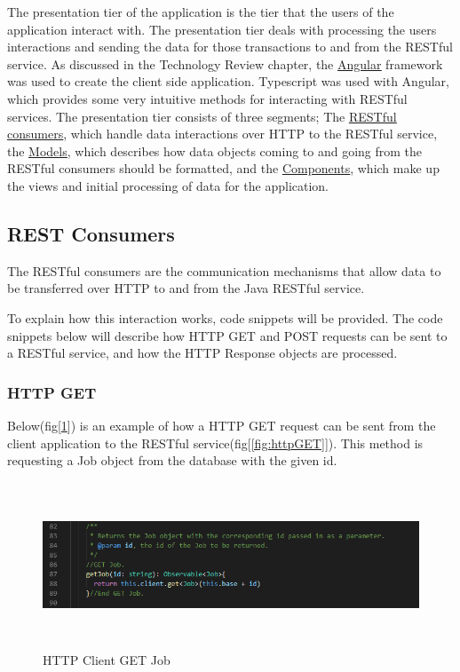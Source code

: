The presentation tier of the application is the tier that the users of the application interact with. The presentation tier deals with processing the users interactions and sending the data for those transactions to and from the RESTful service. As discussed in the Technology Review chapter, the  \hyperref[sec:TechnologyReviewPresentationTier]{\underline{Angular}} framework was used to create the client side application. Typescript was used with Angular, which provides some very intuitive methods for interacting with RESTful services. The presentation tier consists of three segments; The \hyperref[sec:SystemDesignRESTConsumers]{\underline{RESTful consumers}}, which handle data interactions over HTTP to the RESTful service, the \hyperref[sec:SystemDesignModels]{\underline{Models}}, which describes how data objects coming to and going from the RESTful consumers should be formatted, and the \hyperref[sec:SystemDesignComponents]{\underline{Components}}, which make up the views and initial processing of data for the application. 


\subsection{REST Consumers}
\label{sec:SystemDesignRESTConsumers}

The RESTful consumers are the communication mechanisms that allow data to be transferred over HTTP to and from the Java RESTful service. 

\bigskip

To explain how this interaction works, code snippets will be provided. The code snippets below will describe how HTTP GET and POST requests can be sent to a RESTful service, and how the HTTP Response objects are processed.

\subsubsection{HTTP GET}

Below(fig[\ref{fig:GET}]) is an example of how a HTTP GET request can be sent from the client application to the RESTful service(fig[\ref{fig:httpGET}]). This method is requesting a Job object from the database with the given id.

\begin{figure}[H]
    \centering
    \includegraphics[width=\textwidth, height=140pt]{DesignImages/ClientGET.PNG}
    \caption{HTTP Client GET Job}
    \label{fig:GET}
\end{figure}

